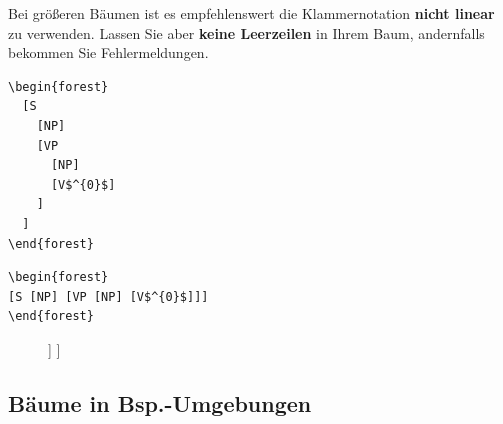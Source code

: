 \begin{frame}[fragile]

Bei größeren Bäumen ist es empfehlenswert die Klammernotation \textbf{nicht linear} zu verwenden. Lassen Sie aber \textbf{keine Leerzeilen} in Ihrem Baum, andernfalls bekommen Sie Fehlermeldungen.


\begin{minipage}[t]{.48\textwidth}
\small	
\begin{lstlisting}
\begin{forest}
  [S 
    [NP] 
    [VP
      [NP]
      [V$^{0}$]
    ]
  ]
\end{forest}
\end{lstlisting}

\vs

\begin{lstlisting}
\begin{forest}
[S [NP] [VP [NP] [V$^{0}$]]]
\end{forest}
\end{lstlisting}
\end{minipage}
\begin{minipage}[t]{.48\textwidth}
\begin{figure}

\centering
\begin{forest}
	[S 
	[NP] 
	[VP
	[NP]
	[V$^{0}$]
	]
	]
\end{forest}

\end{figure}

\end{minipage}

\end{frame}


\subsection{Bäume in Bsp.-Umgebungen}


